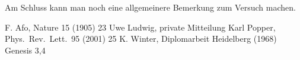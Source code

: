 \documentclass[12pt, a4paper]{article}
\begin{document}
Am Schluss kann man noch eine allgemeinere Bemerkung zum Versuch machen.


\newpage 


\begin{thebibliography}{00}   %

 F. Afo, Nature 15 (1905) 23
 Uwe Ludwig, private Mitteilung
 Karl Popper, Phys.~Rev.~Lett.~95 (2001) 25
 K. Winter, Diplomarbeit Heidelberg (1968)
 Genesis 3,4

\end{thebibliography}
\end{document}
